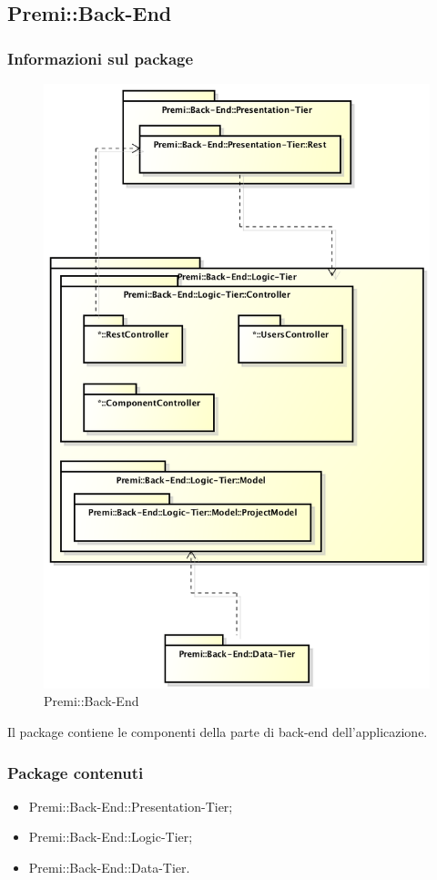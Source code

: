 \subsection{Premi::Back-End}
	\subsubsection*{Informazioni sul package}
		\begin{figure}[h]
			\centering
			\includegraphics[width=0.7\linewidth]{img/back-end_package}
			\caption[Premi::Back-End]{Premi::Back-End}
		\end{figure}
		Il package contiene le componenti della parte di \gls{back-end} dell'applicazione.
		
	\subsubsection*{Package contenuti}
		\begin{itemize}
			\item Premi::Back-End::Presentation-Tier;
			\item Premi::Back-End::Logic-Tier;
			\item Premi::Back-End::Data-Tier.
		\end{itemize}

